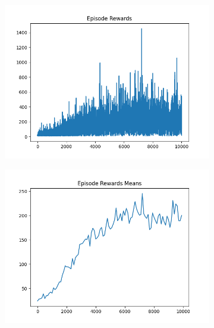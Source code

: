 \begin{figure}[H]
    \centering
    \begin{subfigure}{.47\linewidth}
        \centering
        \includegraphics[width=\textwidth]{pole/2024-06-14_17-21-25_dqn_cartpole_episode_rewards.png}
    \end{subfigure}
    \begin{subfigure}{.47\linewidth}
        \centering
        \includegraphics[width=\textwidth]{pole/2024-06-14_17-21-25_dqn_cartpole_episode_rewards_means.png}
    \end{subfigure}
    \begin{subfigure}{.47\linewidth}
        \centering

\end{subfigure}
\end{figure}
